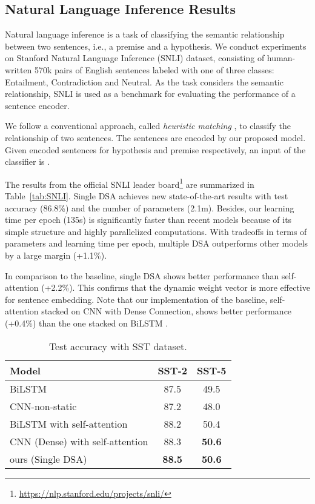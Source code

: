 \documentclass[11pt,a4paper]{article}
\begin{document}
\subsection{Natural Language Inference Results}



Natural language inference is a task of classifying the semantic relationship between two sentences, i.e., a premise and a hypothesis. We conduct experiments on Stanford Natural Language Inference (SNLI) dataset, consisting of human-written 570k pairs of English sentences labeled with one of three classes: Entailment, Contradiction and Neutral. As the task considers the semantic relationship, SNLI is used as a benchmark for evaluating the performance of a sentence encoder.

We follow a conventional approach, called \textit{heuristic matching} \cite{heuristicmatching}, to classify the relationship of two sentences. The sentences are encoded by our proposed model. Given encoded sentences  for hypothesis and premise respectively, an input of the classifier is .



The results from the official SNLI leader  board\footnote{\url{https://nlp.stanford.edu/projects/snli/}} are summarized in Table~\ref{tab:SNLI}. Single DSA achieves new state-of-the-art results with test accuracy (86.8\%) and the number of parameters (2.1m). Besides, our learning time per epoch (135s) is significantly faster than recent models because of its simple structure and highly parallelized computations. With tradeoffs in terms of parameters and learning time per epoch, multiple DSA outperforms other models by a large margin (+1.1\%).

In comparison to the baseline, single DSA shows better performance than self-attention (+2.2\%). This confirms that the dynamic weight vector is more effective for sentence embedding. Note that our implementation of the baseline, self-attention stacked on CNN with Dense Connection, shows better performance (+0.4\%) than the one stacked on BiLSTM \cite{Yang}.

\setlength{\tabcolsep}{0.4em}
\begin{table}[t]
	\small
	\begin{center}
		\begin{tabular}{|l|c|c|}
		    \hline
			{\bf Model} & {\bf SST-2} & {\bf SST-5} \\ 
			\hline
			BiLSTM \cite{baseline_lstm_bilstm} & 87.5  & 49.5  \\
			CNN-non-static \cite{yoonkim} & 87.2 & 48.0\\
			BiLSTM with self-attention  & 88.2   & 50.4 \\
		    CNN (Dense) with self-attention  & 88.3  & \bf{50.6} \\
			\hline
		    ours (Single DSA) & \textbf{88.5} & \textbf{50.6} \\
		    \hline
		\end{tabular}
	\end{center}
	\caption{Test accuracy with SST dataset.}
	\label{tab:SST}
\end{table}
\end{document}
